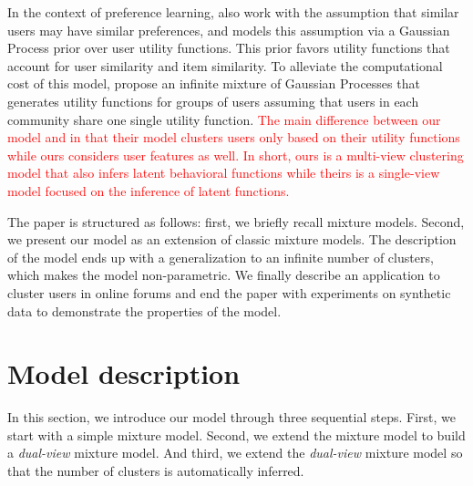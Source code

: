 \documentclass[smallextended]{svjour3}          %
\newcommand\alberto[1]{\textcolor{red}{#1}}
\begin{document}

In the context of preference learning, \cite{Bonilla2010} also work with the assumption that similar users may have similar preferences, and models this assumption via a Gaussian Process prior over user utility functions. This prior favors utility functions that account for user similarity and item similarity. To alleviate the computational cost of this model, \cite{Abbasnejad2013a} propose an infinite mixture of Gaussian Processes that generates utility functions for groups of users assuming that users in each community share one single utility function. 
%
\alberto{The main difference between our model and \cite{Abbasnejad2013a} in that their model clusters users only based on their utility functions while ours considers user features as well. In short, ours is a multi-view clustering model that also infers latent behavioral functions while theirs is a single-view model focused on the inference of latent functions.}


The paper is structured as follows: first, we briefly recall mixture models. Second, we present our model as an extension of classic mixture models. The description of the model ends up with a generalization to an infinite number of clusters, which makes the model non-parametric. We finally describe an application to cluster users in online forums and end the paper with experiments on synthetic data to demonstrate the properties of the model.


\section{Model description}\label{sec:modeldescription}
In this section, we introduce our model through three sequential steps. First, we start with a simple mixture model. Second, we extend the mixture model to build a \textit{dual-view} mixture model. And third, we extend the \textit{dual-view} mixture model so that the number of clusters is automatically inferred.
\end{document}
